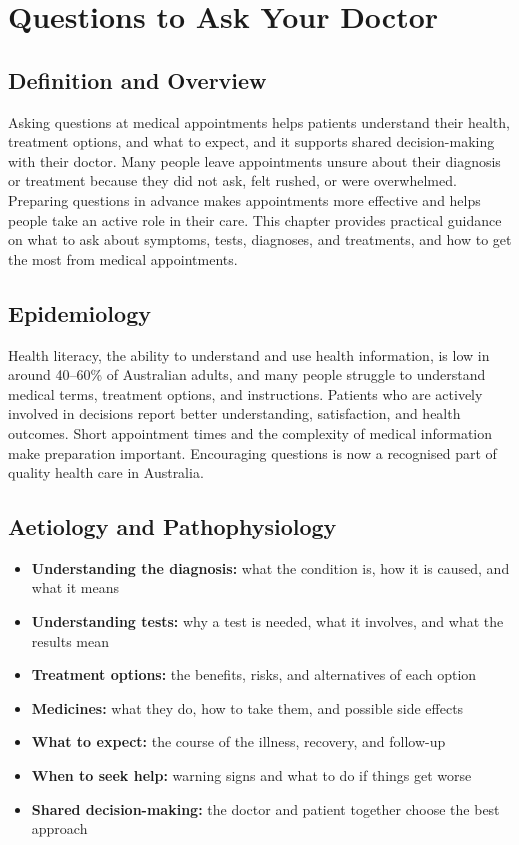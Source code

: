 \chapter{Questions to Ask Your Doctor}

\section*{Definition and Overview}
Asking questions at medical appointments helps patients understand their health, treatment options, and what to expect, and it supports shared decision-making with their doctor. Many people leave appointments unsure about their diagnosis or treatment because they did not ask, felt rushed, or were overwhelmed. Preparing questions in advance makes appointments more effective and helps people take an active role in their care. This chapter provides practical guidance on what to ask about symptoms, tests, diagnoses, and treatments, and how to get the most from medical appointments.

\section*{Epidemiology}
Health literacy, the ability to understand and use health information, is low in around 40--60\% of Australian adults, and many people struggle to understand medical terms, treatment options, and instructions. Patients who are actively involved in decisions report better understanding, satisfaction, and health outcomes. Short appointment times and the complexity of medical information make preparation important. Encouraging questions is now a recognised part of quality health care in Australia.

\section*{Aetiology and Pathophysiology}
\begin{itemize}
    \item \textbf{Understanding the diagnosis:} what the condition is, how it is caused, and what it means
    \item \textbf{Understanding tests:} why a test is needed, what it involves, and what the results mean
    \item \textbf{Treatment options:} the benefits, risks, and alternatives of each option
    \item \textbf{Medicines:} what they do, how to take them, and possible side effects
    \item \textbf{What to expect:} the course of the illness, recovery, and follow-up
    \item \textbf{When to seek help:} warning signs and what to do if things get worse
    \item \textbf{Shared decision-making:} the doctor and patient together choose the best approach
\end{itemize}

